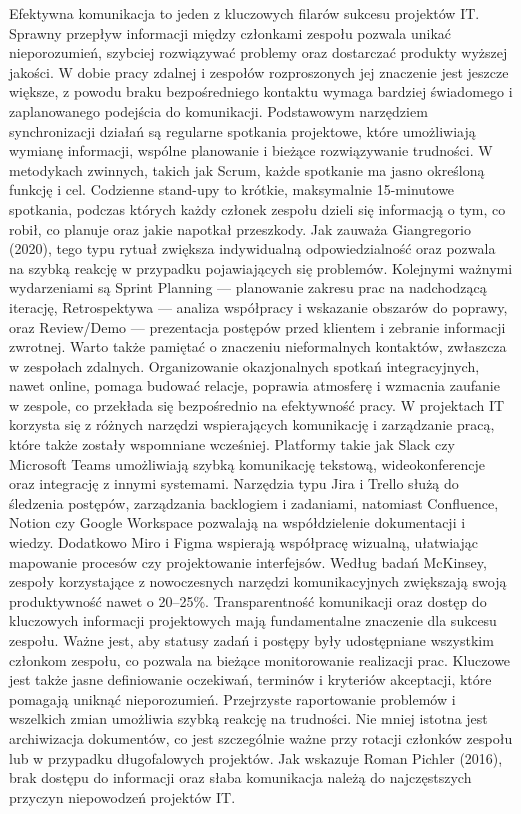 Efektywna komunikacja to jeden z kluczowych filarów sukcesu projektów IT. Sprawny przepływ informacji między członkami zespołu pozwala unikać nieporozumień, szybciej rozwiązywać problemy oraz dostarczać produkty wyższej jakości. W dobie pracy zdalnej i zespołów rozproszonych jej znaczenie jest jeszcze większe, z powodu braku bezpośredniego kontaktu wymaga bardziej świadomego i zaplanowanego podejścia do komunikacji. Podstawowym narzędziem synchronizacji działań są regularne spotkania projektowe, które umożliwiają wymianę informacji, wspólne planowanie i bieżące rozwiązywanie trudności. W metodykach zwinnych, takich jak Scrum, każde spotkanie ma jasno określoną funkcję i cel. Codzienne stand-upy to krótkie, maksymalnie 15-minutowe spotkania, podczas których każdy członek zespołu dzieli się informacją o tym, co robił, co planuje oraz jakie napotkał przeszkody. Jak zauważa Giangregorio (2020), tego typu rytuał zwiększa indywidualną odpowiedzialność oraz pozwala na szybką reakcję w przypadku pojawiających się problemów. Kolejnymi ważnymi wydarzeniami są Sprint Planning — planowanie zakresu prac na nadchodzącą iterację, Retrospektywa — analiza współpracy i wskazanie obszarów do poprawy, oraz Review/Demo — prezentacja postępów przed klientem i zebranie informacji zwrotnej. Warto także pamiętać o znaczeniu nieformalnych kontaktów, zwłaszcza w zespołach zdalnych. Organizowanie okazjonalnych spotkań integracyjnych, nawet online, pomaga budować relacje, poprawia atmosferę i wzmacnia zaufanie w zespole, co przekłada się bezpośrednio na efektywność pracy. W projektach IT korzysta się z różnych narzędzi wspierających komunikację i zarządzanie pracą, które także zostały wspomniane wcześniej. Platformy takie jak Slack czy Microsoft Teams umożliwiają szybką komunikację tekstową, wideokonferencje oraz integrację z innymi systemami. Narzędzia typu Jira i Trello służą do śledzenia postępów, zarządzania backlogiem i zadaniami, natomiast Confluence, Notion czy Google Workspace pozwalają na współdzielenie dokumentacji i wiedzy. Dodatkowo Miro i Figma wspierają współpracę wizualną, ułatwiając mapowanie procesów czy projektowanie interfejsów. Według badań McKinsey, zespoły korzystające z nowoczesnych narzędzi komunikacyjnych zwiększają swoją produktywność nawet o 20--25\%. Transparentność komunikacji oraz dostęp do kluczowych informacji projektowych mają fundamentalne znaczenie dla sukcesu zespołu. Ważne jest, aby statusy zadań i postępy były udostępniane wszystkim członkom zespołu, co pozwala na bieżące monitorowanie realizacji prac. Kluczowe jest także jasne definiowanie oczekiwań, terminów i kryteriów akceptacji, które pomagają uniknąć nieporozumień. Przejrzyste raportowanie problemów i wszelkich zmian umożliwia szybką reakcję na trudności. Nie mniej istotna jest archiwizacja dokumentów, co jest szczególnie ważne przy rotacji członków zespołu lub w przypadku długofalowych projektów. Jak wskazuje Roman Pichler (2016), brak dostępu do informacji oraz słaba komunikacja należą do najczęstszych przyczyn niepowodzeń projektów IT.
